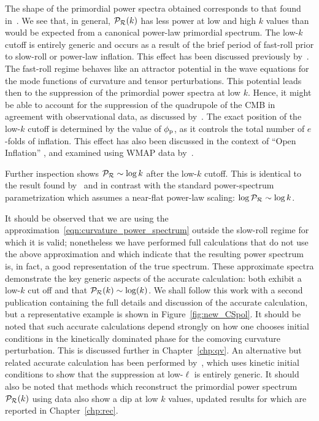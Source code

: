 The shape of the primordial power spectra obtained corresponds to that found in~\cite{lasenby_closed_2003}. We see that, in general, \(\mathcal{P}_{\mathcal{R}}(k)\) has less power at low and high \(k\) values than would be expected from a canonical power-law primordial spectrum.  The low-\(k\) cutoff is entirely generic and occurs as a result of the brief period of fast-roll prior to slow-roll or power-law inflation.  This effect has been discussed previously by~\cite{boyanovsky_cmb_2006}. The fast-roll regime behaves like an attractor potential in the wave equations for the mode functions of curvature and tensor perturbations. This potential leads then to the suppression of the primordial power spectra at low \(k\).  Hence, it might be able to account for the suppression of the quadrupole of the CMB in agreement with observational data, as discussed by~\cite{boyanovsky_cmb_2006-1}.  The exact position of the low-\(k\) cutoff is determined by the value of \(\phi_{\mathrm{p}}\), as it controls the total number of \(e\)-folds of inflation. This effect has also been discussed in the context of ``Open Inflation'' \citep{Yamauchi_strings_2011,Linde_open_1999,Linde_toy_1999}, and examined using WMAP data by~\cite{Contaldi_suppress_2003}.

Further inspection shows \(\mathcal{P}_{\mathcal{R}} \sim \log k\) after the low-\(k\) cutoff. This is identical to the result found by~\cite{lasenby_closed_2003} and in contrast with the standard power-spectrum parametrization which assumes a near-flat power-law scaling: \(\log\mathcal{P}_{\mathcal{R}}\sim \log k\). 

 
It should be observed that we are using the approximation~\eqref{eqn:curvature_power_spectrum} outside the slow-roll regime for which it is valid; nonetheless we have performed full calculations that do not use the above approximation and which indicate that the resulting power spectrum is, in fact, a good representation of the true spectrum. These approximate spectra demonstrate the key generic aspects of the accurate calculation: both exhibit a low-\(k\) cut off and that \(\mathcal{P}_{\mathcal{R}}(k) \sim \log(k)\).  We shall follow this work with a second publication containing the full details and discussion of the accurate calculation, but a representative example is shown in Figure~\ref{fig:new_CSpol}. It should be noted that such accurate calculations depend strongly on how one chooses initial conditions in the kinetically dominated phase for the comoving curvature perturbation. This is discussed further in Chapter~\ref{chp:qv}. An alternative but related accurate calculation has been performed by~\cite{Lello_tensor_2013}, which uses kinetic initial conditions to show that the suppression at low-\(\ell\) is entirely generic. It should also be noted that methods which reconstruct the primordial power spectrum \(\mathcal{P}_{\mathcal{R}}(k)\) \citep{vazquez_reconstruction,Hazra_reconstruction_2013} using data also show a dip at low \(k\) values, updated results for which are reported in Chapter~\ref{chp:rec}.

